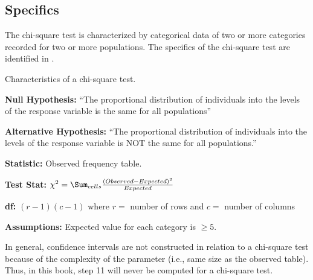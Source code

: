 \documentclass[10pt,openany]{book}\usepackage[]{graphicx}\usepackage[]{color}
\begin{document}
\subsection{Specifics}
The chi-square test is characterized by categorical data of two or more categories recorded for two or more populations.  The specifics of the chi-square test are identified in .

\begin{table}[htbp]
  \caption{Characteristics of a chi-square test.}
  \label{tab:Chispec}
    \begin{Itemize}
      \item \textbf{Null Hypothesis:} ``The proportional distribution of individuals into the levels of the response variable is the same for all populations''
      \item \textbf{Alternative Hypothesis:} ``The proportional distribution of individuals into the levels of the response variable is NOT the same for all populations.''
      \item \textbf{Statistic:} Observed frequency table.
      \vspace{6pt}
      \item \textbf{Test Stat:} $\chi^{2} = \Sum_{cells}\frac{(Observed-Expected)^{2}}{Expected}$
      \vspace{6pt}
      \item \textbf{df:} $(r-1)(c-1)$ where $r=$ number of rows and $c=$ number of columns
      \vspace{6pt}
      \item \textbf{Assumptions:} Expected value for each category is $\geq5$.
    \end{Itemize}
\end{table}

In general, confidence intervals are not constructed in relation to a chi-square test because of the complexity of the parameter (i.e., same size as the observed table).  Thus, in this book, step 11 will never be computed for a chi-square test.

\end{document}
